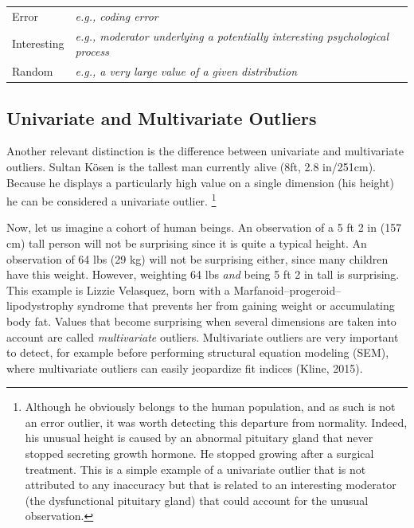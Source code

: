 \documentclass[man,floatsintext]{apa6}
\let\rmarkdownfootnote\footnote%
\def\footnote{\protect\rmarkdownfootnote}
\begin{document}
\begin{longtable}[]{@{}ll@{}}
\toprule
\endhead
\begin{minipage}[t]{0.15\columnwidth}\raggedright
Error\strut
\end{minipage} & \begin{minipage}[t]{0.79\columnwidth}\raggedright
\emph{e.g., coding error}\strut
\end{minipage}\tabularnewline
\begin{minipage}[t]{0.15\columnwidth}\raggedright
Interesting\strut
\end{minipage} & \begin{minipage}[t]{0.79\columnwidth}\raggedright
\emph{e.g., moderator underlying a potentially interesting psychological process}\strut
\end{minipage}\tabularnewline
\begin{minipage}[t]{0.15\columnwidth}\raggedright
Random\strut
\end{minipage} & \begin{minipage}[t]{0.79\columnwidth}\raggedright
\emph{e.g., a very large value of a given distribution}\strut
\end{minipage}\tabularnewline
\bottomrule
\end{longtable}

\hypertarget{univariate-and-multivariate-outliers}{%
\subsection{Univariate and Multivariate Outliers}\label{univariate-and-multivariate-outliers}}

Another relevant distinction is the difference between univariate and multivariate outliers. Sultan Kösen is the tallest man currently alive (8ft, 2.8 in/251cm). Because he displays a particularly high value on a single dimension (his height) he can be considered a univariate outlier. \footnote{Although he obviously belongs to the human population, and as such is not an error outlier, it was worth detecting this departure from normality. Indeed, his unusual height is caused by an abnormal pituitary gland that never stopped secreting growth hormone. He stopped growing after a surgical treatment. This is a simple example of a univariate outlier that is not attributed to any inaccuracy but that is related to an interesting moderator (the dysfunctional pituitary gland) that could account for the unusual observation.}

Now, let us imagine a cohort of human beings. An observation of a 5 ft 2 in (157 cm) tall person will not be surprising since it is quite a typical height. An observation of 64 lbs (29 kg) will not be surprising either, since many children have this weight. However, weighting 64 lbs \emph{and} being 5 ft 2 in tall is surprising. This example is Lizzie Velasquez, born with a Marfanoid--progeroid--lipodystrophy syndrome that prevents her from gaining weight or accumulating body fat. Values that become surprising when several dimensions are taken into account are called \emph{multivariate} outliers. Multivariate outliers are very important to detect, for example before performing structural equation modeling (SEM), where multivariate outliers can easily jeopardize fit indices (Kline, 2015).
\end{document}
